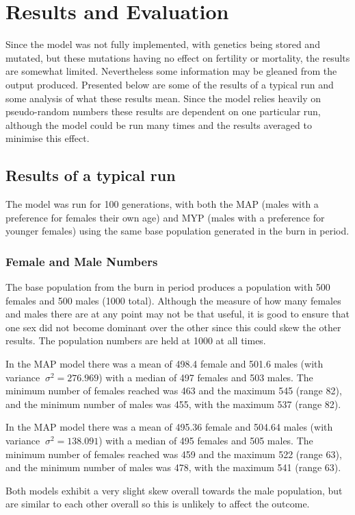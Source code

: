 \documentclass[authoryearcitations]{UoYCSproject}
\begin{document}
\chapter{Results and Evaluation}
\label{cha:Results and Evaluation}
Since the model was not fully implemented, with genetics being stored and mutated, but these mutations having no effect on fertility or mortality, the results are somewhat limited. Nevertheless some information may be gleaned from the output produced. Presented below are some of the results of a typical run and some analysis of what these results mean. Since the model relies heavily on pseudo-random numbers these results are dependent on one particular run, although the model could be run many times and the results averaged to minimise this effect.

\section{Results of a typical run}
The model was run for 100 generations, with both the MAP (males with a preference for females their own age) and MYP (males with a preference for younger females) using the same base population generated in the burn in period. 

\subsection{Female and Male Numbers}
The base population from the burn in period produces a population with 500 females and 500 males (1000 total). Although the measure of how many females and males there are at any point may not be that useful, it is good to ensure that one sex did not become dominant over the other since this could skew the other results. The population numbers are held at 1000 at all times.

In the MAP model there was a mean of 498.4 female and 501.6 males (with variance $\ \sigma^2 = 276.969 $) with a median of 497 females and 503 males. The minimum number of females reached was 463 and the maximum 545 (range 82), and the minimum number of males was 455, with the maximum 537 (range 82).

In the MAP model there was a mean of 495.36 female and 504.64 males (with variance $\ \sigma^2 = 138.091 $) with a median of 495 females and 505 males. The minimum number of females reached was 459 and the maximum 522 (range 63), and the minimum number of males was 478, with the maximum 541 (range 63).

Both models exhibit a very slight skew overall towards the male population, but are similar to each other overall so this is unlikely to affect the outcome.
\end{document}
